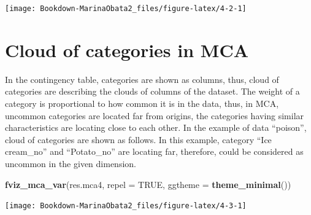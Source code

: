 \documentclass[]{book}
\newenvironment{Shaded}{\begin{snugshade}}{\end{snugshade}}
\newcommand{\DataTypeTok}[1]{\textcolor[rgb]{0.13,0.29,0.53}{#1}}
\newcommand{\DecValTok}[1]{\textcolor[rgb]{0.00,0.00,0.81}{#1}}
\newcommand{\KeywordTok}[1]{\textcolor[rgb]{0.13,0.29,0.53}{\textbf{#1}}}
\newcommand{\NormalTok}[1]{#1}
\newcommand{\OperatorTok}[1]{\textcolor[rgb]{0.81,0.36,0.00}{\textbf{#1}}}
\newcommand{\OtherTok}[1]{\textcolor[rgb]{0.56,0.35,0.01}{#1}}
\newcommand{\StringTok}[1]{\textcolor[rgb]{0.31,0.60,0.02}{#1}}
\begin{document}
\begin{Shaded}
\end{Shaded}

\texttt{[image: Bookdown-MarinaObata2\_files/figure-latex/4-2-1]}

\hypertarget{cloud-of-categories-in-mca}{%
\section{Cloud of categories in MCA}\label{cloud-of-categories-in-mca}}

In the contingency table, categories are shown as columns, thus, cloud of categories are describing the clouds of columns of the dataset. The weight of a category is proportional to how common it is in the data, thus, in MCA, uncommon categories are located far from origins, the categories having similar characteristics are locating close to each other.
In the example of data ``poison'', cloud of categories are shown as follows. In this example, category ``Ice cream\_no'' and ``Potato\_no'' are locating far, therefore, could be considered as uncommon in the given dimension.

\begin{Shaded}
\begin{Highlighting}[]
\KeywordTok{fviz_mca_var}\NormalTok{(res.mca4, }
             \DataTypeTok{repel =} \OtherTok{TRUE}\NormalTok{, }
             \DataTypeTok{ggtheme =} \KeywordTok{theme_minimal}\NormalTok{())}
\end{Highlighting}
\end{Shaded}

\texttt{[image: Bookdown-MarinaObata2\_files/figure-latex/4-3-1]}
\end{document}
